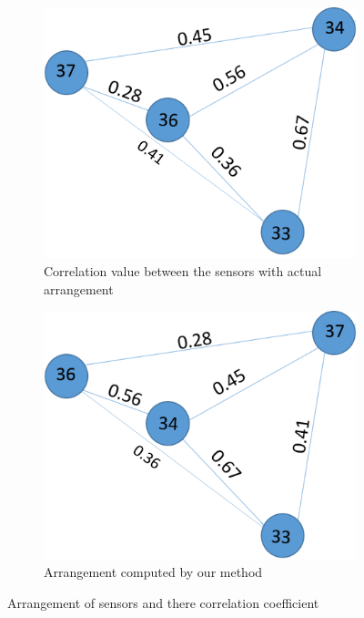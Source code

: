 \begin{figure}[!ht]
\centering
\begin{subfigure}[b]{0.4\textwidth}
\centering
\includegraphics[scale=0.3]{./pics/true_arr.png}
\caption{Correlation value between the sensors with actual arrangement}
\label{fig:true_arr}
\hfill
\end{subfigure}
\begin{subfigure}[b]{0.4\textwidth}
\centering
\includegraphics[scale=0.3]{./pics/computer_arr.png}
\caption{Arrangement computed by our method}
\label{fig:false_arr}
\hfill
\end{subfigure}
\caption{Arrangement of sensors and there correlation coefficient}
\label{fig:arrangement}
\end{figure}

